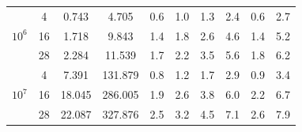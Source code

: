 \documentclass[times, utf8, seminar, numeric]{fer}
\begin{document}
\begin{table}[h]
\begin{tabular}{c|c|c|c|c|c|c|c|c|c}
    \hline
    \multirow{3}{*}{$10^6$}
      & \num{4} & \num{0.743} & \num{4.705} & \num{0.6} & \num{1.0} & \num{1.3} & \num{2.4} & \num{0.6} & \num{2.7} \\
      & \num{16} & \num{1.718} & \num{9.843} & \num{1.4} & \num{1.8} & \num{2.6} & \num{4.6} & \num{1.4} & \num{5.2} \\
      & \num{28} & \num{2.284} & \num{11.539} & \num{1.7} & \num{2.2} & \num{3.5} & \num{5.6} & \num{1.8} & \num{6.2} \\
    \hline
    \multirow{3}{*}{$10^7$}
      & \num{4} & \num{7.391} & \num{131.879} & \num{0.8} & \num{1.2} & \num{1.7} & \num{2.9} & \num{0.9} & \num{3.4} \\
      & \num{16} & \num{18.045} & \num{286.005} & \num{1.9} & \num{2.6} & \num{3.8} & \num{6.0} & \num{2.2} & \num{6.7} \\
      & \num{28} & \num{22.087} & \num{327.876} & \num{2.5} & \num{3.2} & \num{4.5} & \num{7.1} & \num{2.6} & \num{7.9} \\
  \end{tabular}
\end{table}
\end{document}
